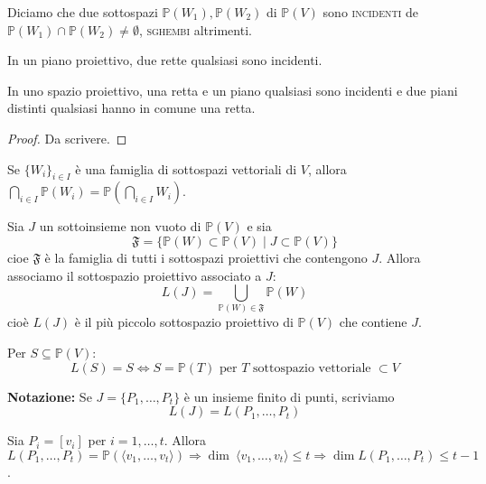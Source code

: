 \begin{defn}
  Diciamo che due sottospazi $\mathbb{P}(W_1), \mathbb{P}(W_2)$ di $\mathbb{P}(V)$ sono \textsc{incidenti} de $\mathbb{P}(W_1) \cap \mathbb{P}(W_2) \not=\emptyset$, \textsc{sghembi} altrimenti.
\end{defn}

\begin{prop}
  \begin{nlist}
    \item In un piano proiettivo, due rette qualsiasi sono incidenti.
    \item In uno spazio proiettivo, una retta e un piano qualsiasi sono incidenti e due piani distinti qualsiasi hanno in comune una retta.
  \end{nlist}
\end{prop}

\begin{proof}
  Da scrivere.
\end{proof}

\begin{oss}
  \begin{nlist}
    \item Se $\{W_i\}_{i \in I}$ è una famiglia di sottospazi vettoriali di $V$, allora $\displaystyle \bigcap_{i \in I} \mathbb{P}(W_i)=\mathbb{P}\left(\bigcap_{i \in I}W_i\right)$.
    \item Sia $J$ un sottoinsieme non vuoto di $\mathbb{P}(V)$ e sia
    $$\mathfrak{F}=\{\mathbb{P}(W) \subset \mathbb{P}(V) \mid J \subset \mathbb{P}(V)\}$$
    cioe $\mathfrak{F}$ è la famiglia di tutti i sottospazi proiettivi che contengono $J$. Allora associamo il sottospazio proiettivo 				associato a $J$:
    $$L(J)=\bigcup _{\mathbb{P}(W) 	\in \mathfrak{F}} \mathbb{P}(W)$$
    cioè $L(J)$ è il più piccolo sottospazio proiettivo di $\mathbb{P}(V)$ che contiene $J$.
    \item Per $S \subseteq \mathbb{P}(V)$:
    $$L(S)=S \Leftrightarrow S=\mathbb{P}(T) \text{ per }T\text{ sottospazio vettoriale }\subset V$$
    \item \textbf{Notazione:} Se $J=\{P_1,\dots,P_t\}$ è un insieme finito di punti, scriviamo
    $$L(J)=L(P_1,\dots,P_t)$$
    \item Sia $P_i=[v_i]$ per $i=1,\dots,t$. Allora $L(P_1,\dots,P_t)=\mathbb{P}(\langle v_1,\dots,v_t \rangle) \Rightarrow \dim \				\langle v_1,\dots,v_t \rangle \le t \Rightarrow \dim L(P_1,\dots,P_t) \le t-1$.
  \end{nlist}
\end{oss}

